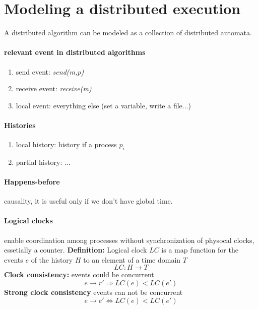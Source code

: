 \documentclass[11pt]{article}
\begin{document}
\section{Modeling a distributed execution} %
\label{sec:modeling_a_distributed_execution}
A distributed algorithm can be modeled as a collection of distributed automata.
\paragraph{relevant event in distributed algorithms} %
\label{par:relevant_event_in_distributed_algorithms}
\begin{enumerate}
	\item send event: \textit{send(m,p)}
	\item receive event: \textit{receive(m)}
	\item local event: everything else (set a variable, write a file...)
\end{enumerate}

\paragraph{Histories} %
\label{par:histories}
\begin{enumerate}
	\item local history: history if a process $p_i$
	\item partial history: ...
\end{enumerate}

\paragraph{Happens-before} %
\label{par:happens_before}
causality, it is useful only if we don't have global time.

\paragraph{Logical clocks} %
\label{par:logical_clocks}
enable coordination among processes without synchronization of physocal clocks, essetially a counter.
\textbf{Definition:} Logical clock $LC$ is a map function for the events $e$ of the history $H$ to an element of a time domain $T$
\[
	LC : H \rightarrow T
\]
\textbf{Clock consistency:} events could be concurrent\[
	e \rightarrow r' \Rightarrow LC(e) < LC(e')
\]
\textbf{Strong clock consistency} events can not be concurrent\[
	e \rightarrow e' \Leftrightarrow LC(e) < LC(e')
\]
\end{document}
